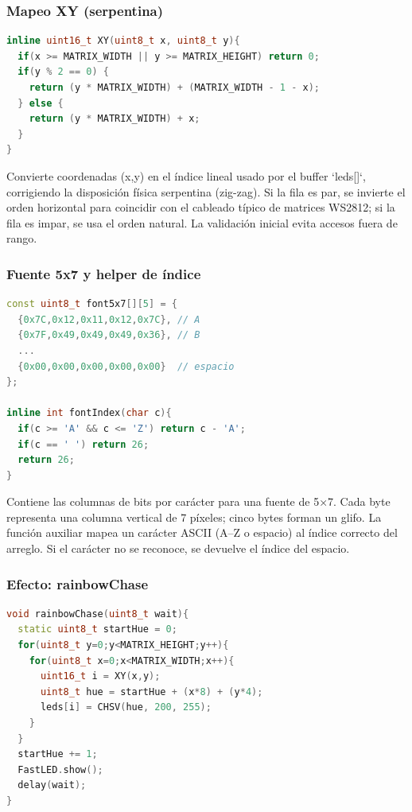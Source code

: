 \documentclass[a4paper,12pt]{article}
\begin{document}
\subsubsection{Mapeo XY (serpentina)}

\begin{lstlisting}[language=C++, caption={Función de mapeo XY para matriz serpentina}]
inline uint16_t XY(uint8_t x, uint8_t y){
  if(x >= MATRIX_WIDTH || y >= MATRIX_HEIGHT) return 0;
  if(y % 2 == 0) {
    return (y * MATRIX_WIDTH) + (MATRIX_WIDTH - 1 - x);
  } else {
    return (y * MATRIX_WIDTH) + x;
  }
}
\end{lstlisting}

Convierte coordenadas (x,y) en el índice lineal usado por el buffer `leds[]`, corrigiendo la disposición física serpentina (zig-zag). Si la fila es par, se invierte el orden horizontal para coincidir con el cableado típico de matrices WS2812; si la fila es impar, se usa el orden natural. La validación inicial evita accesos fuera de rango.

\newpage

\subsubsection{Fuente 5x7 y helper de índice}

\begin{lstlisting}[language=C++, caption={Fuente 5x7 y función auxiliar}]
const uint8_t font5x7[][5] = {
  {0x7C,0x12,0x11,0x12,0x7C}, // A
  {0x7F,0x49,0x49,0x49,0x36}, // B
  ...
  {0x00,0x00,0x00,0x00,0x00}  // espacio
};

inline int fontIndex(char c){
  if(c >= 'A' && c <= 'Z') return c - 'A';
  if(c == ' ') return 26;
  return 26;
}
\end{lstlisting}

Contiene las columnas de bits por carácter para una fuente de 5×7. Cada byte representa una columna vertical de 7 píxeles; cinco bytes forman un glifo. La función auxiliar mapea un carácter ASCII (A–Z o espacio) al índice correcto del arreglo. Si el carácter no se reconoce, se devuelve el índice del espacio.

\subsubsection{Efecto: rainbowChase}

\begin{lstlisting}[language=C++, caption={Efecto rainbowChase}]
void rainbowChase(uint8_t wait){
  static uint8_t startHue = 0;
  for(uint8_t y=0;y<MATRIX_HEIGHT;y++){
    for(uint8_t x=0;x<MATRIX_WIDTH;x++){
      uint16_t i = XY(x,y);
      uint8_t hue = startHue + (x*8) + (y*4);
      leds[i] = CHSV(hue, 200, 255);
    }
  }
  startHue += 1;
  FastLED.show();
  delay(wait);
}
\end{lstlisting}
\end{document}
